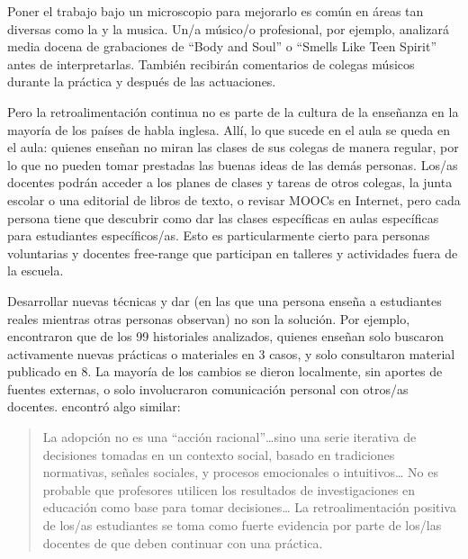 Poner el trabajo bajo un microscopio para mejorarlo es común
en áreas tan diversas como la  y la musica.
Un/a músico/o profesional,
por ejemplo,
analizará media docena de grabaciones de ``Body and Soul'' o ``Smells Like Teen Spirit'' antes de interpretarlas.
También recibirán comentarios de colegas músicos durante la práctica y después de las actuaciones.

Pero la retroalimentación continua no es parte de la cultura de la enseñanza en la mayoría de los países de habla inglesa.
Allí,
lo que sucede en el aula se queda en el aula:
quienes enseñan no miran las clases de sus colegas de manera regular,
por lo que no pueden tomar prestadas las buenas ideas de las demás personas.
Los/as docentes podrán acceder a los planes de clases y tareas de otros colegas,
la junta escolar o una editorial de libros de texto,
o revisar MOOCs en Internet,
pero cada persona tiene que descubrir
como dar las clases específicas en aulas específicas para estudiantes específicos/as.
Esto es particularmente cierto para personas voluntarias y docentes free-range
que participan en talleres y actividades fuera de la escuela.

Desarrollar nuevas técnicas
y dar 
(en las que una persona enseña a estudiantes reales mientras otras personas observan)
no son la solución.
Por ejemplo,
\cite{Finc2007,Finc2012} encontraron que de los 99 historiales analizados,
quienes enseñan solo buscaron activamente nuevas prácticas o materiales en 3 casos,
y solo consultaron material publicado en 8.
La mayoría de los cambios se dieron localmente,
sin aportes de fuentes externas,
o solo involucraron comunicación personal con otros/as docentes.
\cite{Bark2015} encontró algo similar:

\begin{quote}

  La adopción no es una ``acción racional''{\ldots}sino
  una serie iterativa de decisiones tomadas en un contexto social,
  basado en tradiciones normativas, señales sociales,
  y procesos emocionales o intuitivos{\ldots}
  No es probable que profesores utilicen los resultados de investigaciones en educación
  como base para tomar decisiones{\ldots}
  La retroalimentación positiva de los/as estudiantes se toma como fuerte evidencia por parte de los/las docentes
  de que deben continuar con una práctica.

\end{quote}

